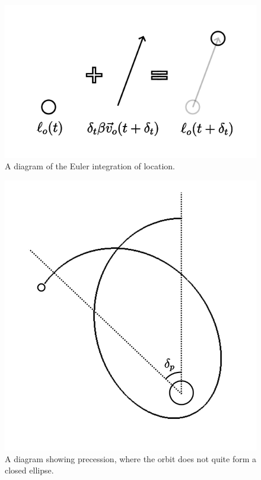 \documentclass[12pt]{article}
\begin{document}
\begin{figure} 
\centering
\label{fig8}
  \includegraphics[width = 6 in]{location.png}
  \caption{
A diagram of the Euler integration of location.
}
\end{figure}



\begin{figure} 
\centering
\label{fig4}
  \includegraphics[width = 6 in]{precession.png}
  \caption{ A diagram showing precession, where the orbit does not quite form a closed ellipse.
}
\end{figure}
\end{document}
